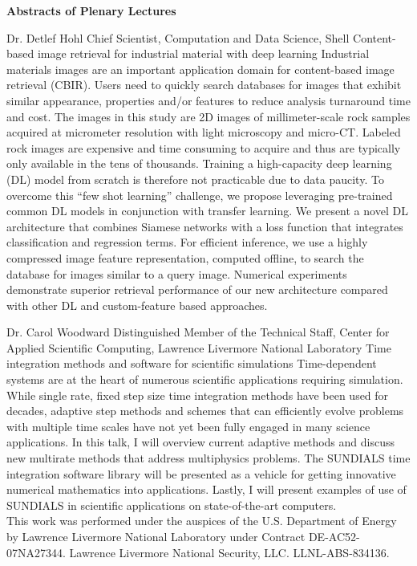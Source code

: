 \begin{center}
\label{plenary}
{\Large \bfseries Abstracts of Plenary Lectures}
\end{center}
\vspace{1ex}


\label{plenary1}
\plenabs
{Dr. Detlef Hohl}
{Chief Scientist, Computation and Data Science, Shell}
{Content-based image retrieval for industrial material with deep learning}
{Industrial materials images are an important application domain for content-based image retrieval (CBIR). Users need to quickly search databases for images that exhibit similar appearance, properties and/or features to reduce analysis turnaround time and cost. The images in this study are 2D images of millimeter-scale rock samples acquired at micrometer resolution with light microscopy and micro-CT. Labeled rock images are expensive and time consuming to acquire and thus are typically only available in the tens of thousands. Training a high-capacity deep learning (DL) model from scratch is therefore not practicable due to data paucity. To overcome this ``few shot learning'' challenge, we propose leveraging pre-trained common DL models in conjunction with transfer learning.  We present a novel DL architecture that combines Siamese networks with a loss function that integrates classification and regression terms. For efficient inference, we use a highly compressed image feature representation, computed offline, to search the database for images similar to a query image. Numerical experiments demonstrate superior retrieval performance of our new architecture compared with other DL and custom-feature based approaches.}
\bigskip





\label{plenary2}
\plenabs
{Dr. Carol Woodward}
{Distinguished Member of the Technical Staff, Center for Applied Scientific Computing, Lawrence Livermore National Laboratory}
{Time integration methods and software for scientific simulations}
{Time-dependent systems are at the heart of numerous scientific applications requiring simulation. While single rate, fixed step size time integration methods have been used for decades, adaptive step methods and schemes that can efficiently evolve problems with multiple time scales have not yet been fully engaged in many science applications. In this talk, I will overview current adaptive methods and discuss new multirate methods that address multiphysics problems. The SUNDIALS time integration software library will be presented as a vehicle for getting innovative numerical mathematics into applications. Lastly, I will present examples of use of SUNDIALS in scientific applications on state-of-the-art computers.\\
This work was performed under the auspices of the U.S. Department of Energy by Lawrence Livermore National Laboratory under Contract DE-AC52-07NA27344. Lawrence Livermore National Security, LLC. LLNL-ABS-834136.}
\bigskip


